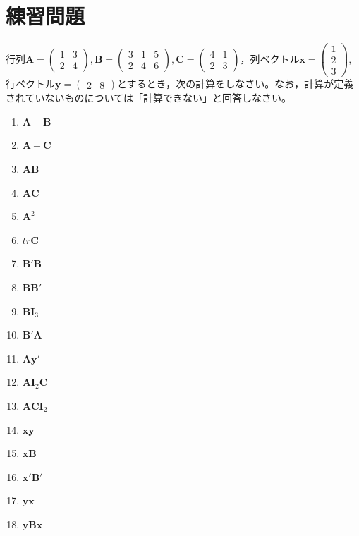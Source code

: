 \documentclass{ltjsbook}
\begin{document}
\section{練習問題}
行列$\bm{A}=\begin{pmatrix}1 & 3 \\2 & 4\end{pmatrix},\bm{B}=\begin{pmatrix}3&1&5\\2&4&6\end{pmatrix},\bm{C}=\begin{pmatrix}4&1\\2&3\end{pmatrix}$，列ベクトル$\bm{x}=\begin{pmatrix}1\\2\\3\end{pmatrix}$,行ベクトル$\bm{y}=\begin{pmatrix}2&8\end{pmatrix}$とするとき，次の計算をしなさい。なお，計算が定義されていないものについては「計算できない」と回答しなさい。
\begin{enumerate}
	\item $\bm{A}+\bm{B}$
	\item $\bm{A}-\bm{C}$
	\item $\bm{AB}$
	\item $\bm{AC}$
	\item $\bm{A}^2$
	\item $tr\bm{C}$
	\item $\bm{B}'\bm{B}$
	\item $\bm{BB}'$
	\item $\bm{B}\bm{I}_3$
	\item $\bm{B}'\bm{A}$
	\item $\bm{A}\bm{y}'$
	\item $\bm{A}\bm{I}_2\bm{C}$
	\item $\bm{A}\bm{C}\bm{I}_2$
	\item $\bm{xy}$
	\item $\bm{xB}$
	\item $\bm{x}'\bm{B}'$
	\item $\bm{yx}$
	\item $\bm{yBx}$
\end{enumerate}
\end{document}
